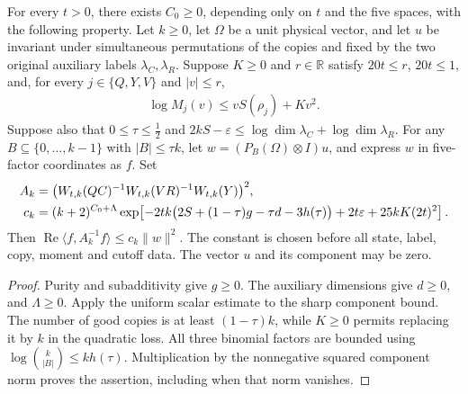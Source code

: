 \begin{theorem}
  \label{thm:actual_component_inverse_sharp_uniform}
  \leanok
  For every $t>0$, there exists $C_0\geq0$, depending only on $t$
  and the five spaces, with the following property.
  Let $k\geq0$, let $\Omega$ be a unit physical vector, and let $u$
  be invariant under simultaneous permutations of the copies and
  fixed by the two original auxiliary labels $\lambda_C,\lambda_R$.
  Suppose $K\geq0$ and $r\in\mathbb R$ satisfy $20t\leq r$,
  $20t\leq1$, and, for every $j\in\{Q,Y,V\}$ and $|v|\leq r$,
  \begin{align*}
    \log M_j(v)\leq vS(\rho_j)+Kv^2.
  \end{align*}
  Suppose also that $0\leq\tau\leq\frac12$ and
  $2kS-\varepsilon\leq\log\dim\lambda_C+\log\dim\lambda_R$.
  For any $B\subseteq\{0,\ldots,k-1\}$ with $|B|\leq\tau k$, let
  $w=(P_B(\Omega)\otimes I)u$, and express $w$ in five-factor
  coordinates as $f$. Set
  \begin{align}
    A_k&=\bigl(W_{t,k}(QC)^{-1}W_{t,k}(VR)^{-1}W_{t,k}(Y)\bigr)^2,\notag\\
    c_k&=(k+2)^{C_0+\Lambda}
      \exp\!\left[-2tk\bigl(2S+(1-\tau)g-\tau d-3h(\tau)\bigr)
        +2t\varepsilon+25kK(2t)^2\right].
    \label{eq:sharp_uniform_rate}
  \end{align}
  Then $\operatorname{Re}\langle f,A_k^{-1}f\rangle\leq c_k\|w\|^2$.
  The constant is chosen before all state, label, copy, moment and
  cutoff data. The vector $u$ and its component may be zero.
\end{theorem}
\begin{proof}
  \leanok
  Purity and subadditivity give $g\geq0$. The auxiliary dimensions
  give $d\geq0$, and $\Lambda\geq0$.
  Apply the uniform scalar estimate to the sharp component bound.
  The number of good copies is at least $(1-\tau)k$, while $K\geq0$
  permits replacing it by $k$ in the quadratic loss.
  All three binomial factors are bounded using
  $\log\binom{k}{|B|}\leq kh(\tau)$.
  Multiplication by the nonnegative squared component norm proves
  the assertion, including when that norm vanishes.
\end{proof}

